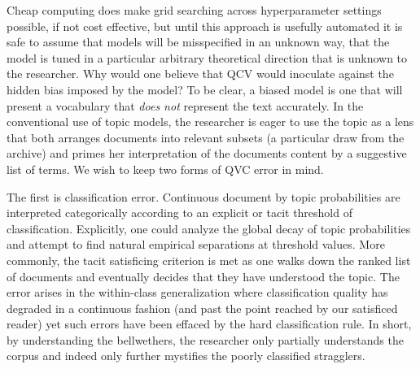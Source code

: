 \documentclass[]{book}
\theoremstyle{definition}
\theoremstyle{definition}
\theoremstyle{definition}
\theoremstyle{remark}
\begin{document}
Cheap computing does make grid searching across hyperparameter settings
possible, if not cost effective, but until this approach is usefully
automated it is safe to assume that models will be misspecified in an
unknown way, that the model is tuned in a particular arbitrary
theoretical direction that is unknown to the researcher. Why would one
believe that QCV would inoculate against the hidden bias imposed by the
model? To be clear, a biased model is one that will present a vocabulary
that \emph{does not} represent the text accurately. In the conventional
use of topic models, the researcher is eager to use the topic as a lens
that both arranges documents into relevant subsets (a particular draw
from the archive) and primes her interpretation of the documents content
by a suggestive list of terms. We wish to keep two forms of QVC error in
mind.

The first is classification error. Continuous document by topic
probabilities are interpreted categorically according to an explicit or
tacit threshold of classification. Explicitly, one could analyze the
global decay of topic probabilities and attempt to find natural
empirical separations at threshold values. More commonly, the tacit
satisficing criterion is met as one walks down the ranked list of
documents and eventually decides that they have understood the topic.
The error arises in the within-class generalization where classification
quality has degraded in a continuous fashion (and past the point reached
by our satisficed reader) yet such errors have been effaced by the hard
classification rule. In short, by understanding the bellwethers, the
researcher only partially understands the corpus and indeed only further
mystifies the poorly classified stragglers.
\end{document}

